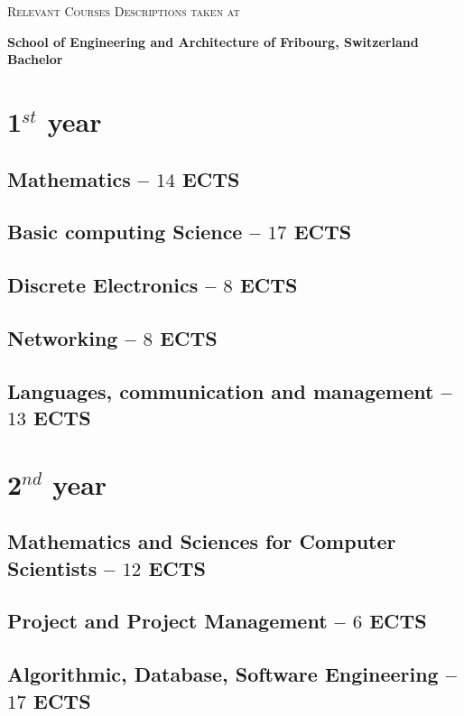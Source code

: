 \documentclass[11pt]{article}
\newcommand*{\heia}{School of Engineering and Architecture of Fribourg}
\newcommand{\module}[2]{
    \subsection[#1]{#1 \small -- $#2$ ECTS}
}
\begin{document}
\textsc{\LARGE Relevant Courses Descriptions taken at}%
\begin{center}
    \textbf{\heia{}, Switzerland\\Bachelor}
\end{center}

\tableofcontents

%
%
\section{1$^{st}$ year}
\module{Mathematics}{14}
\pagebreak

\module{Basic computing Science}{17}

\pagebreak
\module{Discrete Electronics}{8}

\module{Networking}{8}

\pagebreak
\module{Languages, communication and management}{13}


%
%
\pagebreak
\section{2$^{nd}$ year}
\module{Mathematics and Sciences for Computer Scientists}{12}

\module{Project and Project Management}{6}
\pagebreak

\module{Algorithmic, Database, Software Engineering}{17}
\end{document}
